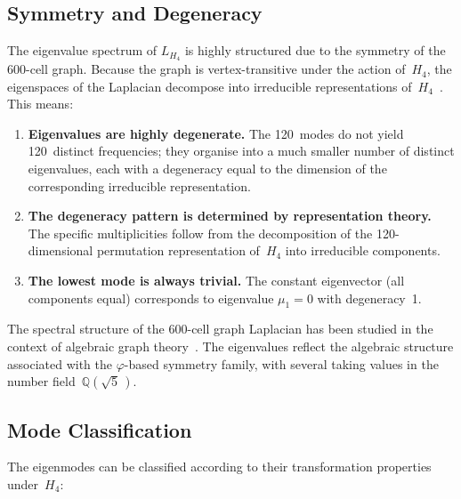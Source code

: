 \documentclass[12pt,a4paper]{article}
\newcommand{\Hfour}{H_4}
\newcommand{\vphi}{\varphi}
\newcommand{\Lmat}{L_{H_4}}
\newcommand{\Q}{\mathbb{Q}}
\begin{document}
\subsection{Symmetry and Degeneracy}

The eigenvalue spectrum of $\Lmat$ is highly structured due to the symmetry of
the 600-cell graph.  Because the graph is vertex-transitive under the action
of~$\Hfour$, the eigenspaces of the Laplacian decompose into irreducible
representations of~$\Hfour$~\cite{chung1997}.  This means:

\begin{enumerate}[nosep]
  \item \textbf{Eigenvalues are highly degenerate.}  The 120~modes do not
    yield 120~distinct frequencies; they organise into a much smaller number of
    distinct eigenvalues, each with a degeneracy equal to the dimension of the
    corresponding irreducible representation.

  \item \textbf{The degeneracy pattern is determined by representation
    theory.}  The specific multiplicities follow from the decomposition of the
    120-dimensional permutation representation of~$\Hfour$ into irreducible
    components.

  \item \textbf{The lowest mode is always trivial.}  The constant eigenvector
    (all components equal) corresponds to eigenvalue $\mu_1 = 0$ with
    degeneracy~1.
\end{enumerate}

The spectral structure of the 600-cell graph Laplacian has been studied in the
context of algebraic graph theory~\cite{brouwer2012}.  The eigenvalues reflect the algebraic structure associated with the
$\vphi$-based symmetry family, with several taking values in the number
field~$\Q(\sqrt{5}\,)$.

\subsection{Mode Classification}

The eigenmodes can be classified according to their transformation properties
under~$\Hfour$:
\end{document}
